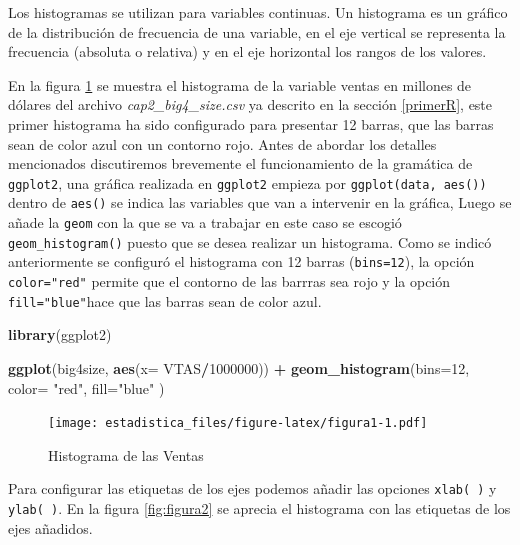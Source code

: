 \documentclass[]{book}
\newenvironment{Shaded}{\begin{snugshade}}{\end{snugshade}}
\newcommand{\KeywordTok}[1]{\textcolor[rgb]{0.13,0.29,0.53}{\textbf{#1}}}
\newcommand{\DataTypeTok}[1]{\textcolor[rgb]{0.13,0.29,0.53}{#1}}
\newcommand{\DecValTok}[1]{\textcolor[rgb]{0.00,0.00,0.81}{#1}}
\newcommand{\StringTok}[1]{\textcolor[rgb]{0.31,0.60,0.02}{#1}}
\newcommand{\OperatorTok}[1]{\textcolor[rgb]{0.81,0.36,0.00}{\textbf{#1}}}
\newcommand{\NormalTok}[1]{#1}
\begin{document}
Los histogramas se utilizan para variables continuas. Un histograma es
un gráfico de la distribución de frecuencia de una variable, en el eje
vertical se representa la frecuencia (absoluta o relativa) y en el eje
horizontal los rangos de los valores.

En la figura \ref{fig:figura1} se muestra el histograma de la variable
ventas en millones de dólares del archivo \emph{cap2\_big4\_size.csv} ya
descrito en la sección \ref{primerR}, este primer histograma ha sido
configurado para presentar 12 barras, que las barras sean de color azul
con un contorno rojo. Antes de abordar los detalles mencionados
discutiremos brevemente el funcionamiento de la gramática de
\texttt{ggplot2}, una gráfica realizada en \texttt{ggplot2} empieza por
\texttt{ggplot(data,\ aes())} dentro de \texttt{aes()} se indica las
variables que van a intervenir en la gráfica, Luego se añade la
\texttt{geom} con la que se va a trabajar en este caso se escogió
\texttt{geom\_histogram()} puesto que se desea realizar un histograma.
Como se indicó anteriormente se configuró el histograma con 12 barras
(\texttt{bins=12}), la opción \texttt{color="red"} permite que el
contorno de las barrras sea rojo y la opción \texttt{fill="blue"}hace
que las barras sean de color azul.

\begin{Shaded}
\begin{Highlighting}[]
\KeywordTok{library}\NormalTok{(ggplot2)}

\KeywordTok{ggplot}\NormalTok{(big4size, }\KeywordTok{aes}\NormalTok{(}\DataTypeTok{x=}\NormalTok{ VTAS}\OperatorTok{/}\DecValTok{1000000}\NormalTok{)) }\OperatorTok{+}\StringTok{ }\KeywordTok{geom_histogram}\NormalTok{(}\DataTypeTok{bins=}\DecValTok{12}\NormalTok{, }\DataTypeTok{color=} \StringTok{"red"}\NormalTok{, }\DataTypeTok{fill=}\StringTok{"blue"}\NormalTok{ )}
\end{Highlighting}
\end{Shaded}

\begin{figure}
\centering
\texttt{[image: estadistica\_files/figure-latex/figura1-1.pdf]}
\caption{\label{fig:figura1}Histograma de las Ventas}
\end{figure}

Para configurar las etiquetas de los ejes podemos añadir las opciones
\texttt{xlab(\ )} y \texttt{ylab(\ )}. En la figura \ref{fig:figura2} se
aprecia el histograma con las etiquetas de los ejes añadidos.
\end{document}
